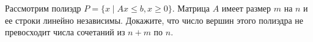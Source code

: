 Рассмотрим полиэдр $P = \{x \mid Ax \le b, x \ge 0\}$. Матрица $A$ имеет размер $m$ на $n$ и ее строки линейно
независимы. Докажите, что число вершин этого полиэдра не превосходит числа сочетаний из $n + m$ по $n$.
